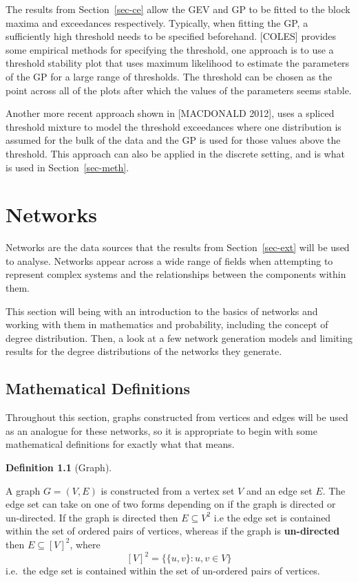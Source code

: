 \documentclass[
  10pt,
  a4paper,
]{scrreprt}
\theoremstyle{plain}
\theoremstyle{plain}
\theoremstyle{definition}
\newtheorem{definition}{Definition}[section]
\theoremstyle{plain}
\theoremstyle{remark}
\begin{document}
{The results from Section~\ref{sec-ce} allow the GEV and GP to be fitted
to the block maxima and exceedances respectively. Typically, when
fitting the GP, a sufficiently high threshold needs to be specified
beforehand. {[}COLES{]} provides some empirical methods for specifying
the threshold, one approach is to use a threshold stability plot that
uses maximum likelihood to estimate the parameters of the GP for a large
range of thresholds. The threshold can be chosen as the point across all
of the plots after which the values of the parameters seems stable.

Another more recent approach shown in {[}MACDONALD 2012{]}, uses a
spliced threshold mixture to model the threshold exceedances where one
distribution is assumed for the bulk of the data and the GP is used for
those values above the threshold. This approach can also be applied in
the discrete setting, and is what is used in Section~\ref{sec-meth}.

\hypertarget{sec-net}{%
\chapter{Networks}\label{sec-net}}

Networks are the data sources that the results from
Section~\ref{sec-ext} will be used to analyse. Networks appear across a
wide range of fields when attempting to represent complex systems and
the relationships between the components within them.

This section will being with an introduction to the basics of networks
and working with them in mathematics and probability, including the
concept of degree distribution. Then, a look at a few network generation
models and limiting results for the degree distributions of the networks
they generate.

\hypertarget{mathematical-definitions}{%
\section{Mathematical Definitions}\label{mathematical-definitions}}

Throughout this section, graphs constructed from vertices and edges will
be used as an analogue for these networks, so it is appropriate to begin
with some mathematical definitions for exactly what that means.

\begin{definition}[Graph]\protect\hypertarget{def-net}{}\label{def-net}

A graph \(G = (V,E)\) is constructed from a vertex set \(V\) and an edge
set \(E\). The edge set can take on one of two forms depending on if the
graph is directed or un-directed. If the graph is directed then
\(E\subseteq V^2\) i.e the edge set is contained within the set of
ordered pairs of vertices, whereas if the graph is \textbf{un-directed}
then \(E\subseteq [V]^2\), where \[
[V]^2 = \{\{u,v\}:u,v\in V\}
\] i.e.~the edge set is contained within the set of un-ordered pairs of
vertices.


\end{definition}}
\end{document}
